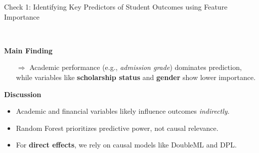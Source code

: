 \documentclass[aspectratio=169]{beamer}
\begin{document}
\begin{frame}{Check 1: Identifying Key Predictors of Student Outcomes using Feature Importance}
\begin{columns}
\begin{column}{0.65\textwidth}
\vspace{10pt} \\
\textbf{Main Finding}
\begin{itemize}
	\item [$\Rightarrow$] Academic performance (e.g., \textit{admission grade}) dominates prediction, while variables like \textbf{scholarship status} and \textbf{gender} show lower importance.
\end{itemize}

\vspace{5pt}   
   
\textbf{Discussion}
\begin{itemize}[label=--, itemsep=1pt]
    \item Academic and financial variables likely influence outcomes \textit{indirectly}.
    \item Random Forest prioritizes predictive power, not causal relevance.
    \item For \textbf{direct effects}, we rely on causal models like DoubleML and DPL.
\end{itemize}



\end{column}
\end{columns}
\end{frame}
\end{document}
